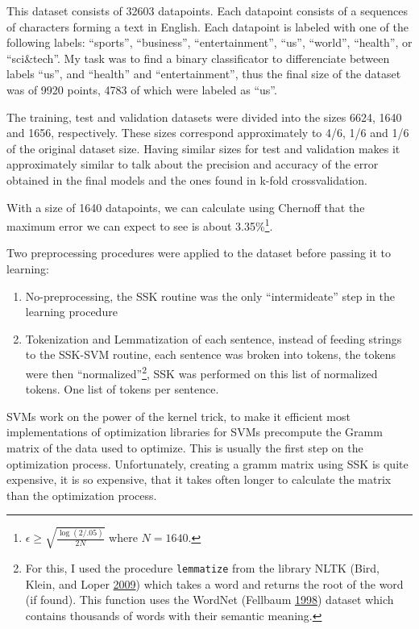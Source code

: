 \documentclass[format=acmtog]{acmart}
\providecommand{\tightlist}{%
  \setlength{\itemsep}{0pt}\setlength{\parskip}{0pt}}
\begin{document}
This dataset consists of 32603 datapoints. Each datapoint consists of a
sequences of characters forming a text in English. Each datapoint is
labeled with one of the following labels: ``sports'', ``business'',
``entertainment'', ``us'', ``world'', ``health'', or ``sci\&tech''. My
task was to find a binary classificator to differenciate between labels
``us'', and ``health'' and ``entertainment'', thus the final size of the
dataset was of 9920 points, 4783 of which were labeled as ``us''.

The training, test and validation datasets were divided into the sizes
6624, 1640 and 1656, respectively. These sizes correspond approximately
to 4/6, 1/6 and 1/6 of the original dataset size. Having similar sizes
for test and validation makes it approximately similar to talk about the
precision and accuracy of the error obtained in the final models and the
ones found in k-fold crossvalidation.

With a size of 1640 datapoints, we can calculate using Chernoff that the
maximum error we can expect to see is about 3.35\%\footnote{\(\epsilon \geq \sqrt{ \frac{\log(2/.05)}{2 N} }\)
  where \(N = 1640\).}.

Two preprocessing procedures were applied to the dataset before passing
it to learning:

\begin{enumerate}
\def\labelenumi{\arabic{enumi}.}
\tightlist
\item
  No-preprocessing, the SSK routine was the only ``intermideate'' step
  in the learning procedure
\item
  Tokenization and Lemmatization of each sentence, instead of feeding
  strings to the SSK-SVM routine, each sentence was broken into tokens,
  the tokens were then ``normalized''\footnote{For this, I used the
    procedure \texttt{lemmatize} from the library NLTK (Bird, Klein, and
    Loper \protect\hyperlink{ref-BirdKleinLoper09}{2009}) which takes a
    word and returns the root of the word (if found). This function uses
    the WordNet (Fellbaum \protect\hyperlink{ref-wordnet}{1998}) dataset
    which contains thousands of words with their semantic meaning.}, SSK
  was performed on this list of normalized tokens. One list of tokens
  per sentence.
\end{enumerate}

SVMs work on the power of the kernel trick, to make it efficient most
implementations of optimization libraries for SVMs precompute the Gramm
matrix of the data used to optimize. This is usually the first step on
the optimization process. Unfortunately, creating a gramm matrix using
SSK is quite expensive, it is so expensive, that it takes often longer
to calculate the matrix than the optimization process.
\end{document}
